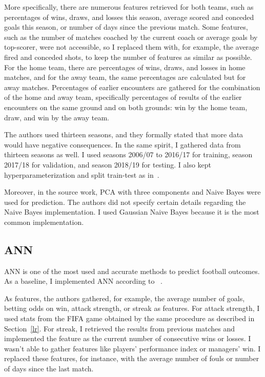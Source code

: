 \documentclass[thesis=M,english]{FITthesis}[2019/12/23]
\begin{document}
More specifically, there are numerous features retrieved for both teams, such as percentages of wins, draws, and losses this season, average scored and conceded goals this season, or number of days since the previous match. Some features, such as the number of matches coached by the current coach or average goals by top-scorer, were not accessible, so I replaced them with, for example, the average fired and conceded shots, to keep the number of features as similar as possible. For the home team, there are percentages of wins, draws, and losses in home matches, and for the away team, the same percentages are calculated but for away matches. Percentages of earlier encounters are gathered for the combination of the home and away team, specifically percentages of results of the earlier encounters on the same ground and on both grounds: win by the home team, draw, and win by the away team.

The authors used thirteen seasons, and they formally stated that more data would have negative consequences. In the same spirit, I gathered data from thirteen seasons as well. I used seasons 2006/07 to 2016/17 for training, season 2017/18 for validation, and season 2018/19 for testing. I also kept hyperparameterization and split train-test as in~\cite{Dutch_football}.

Moreover, in the source work, PCA with three components and Naive Bayes were used for prediction. The authors did not specify certain details regarding the Naive Bayes implementation. I used Gaussian Naive Bayes because it is the most common implementation.

\subsection{ANN}

ANN is one of the most used and accurate methods to predict football outcomes. As a baseline, I implemented ANN according to ~\cite{BPL_ANN_logistic_regression}.

As features, the authors gathered, for example, the average number of goals, betting odds on win, attack strength, or streak as features. For attack strength, I used stats from the FIFA game obtained by the same procedure as described in Section~\ref{lr}. For streak, I retrieved the results from previous matches and implemented the feature as the current number of consecutive wins or losses. I wasn't able to gather features like players’ performance index or managers’ win. I replaced these features, for instance, with the average number of fouls or number of days since the last match.
\end{document}
